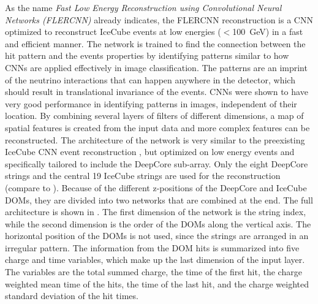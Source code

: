 As the name \textit{Fast Low Energy Reconstruction using Convolutional Neural Networks (FLERCNN)} already indicates, the FLERCNN reconstruction  is a CNN optimized to reconstruct IceCube events at low energies ($<$\SI{100}{\giga\electronvolt}) in a fast and efficient manner. The network is trained to find the connection between the hit pattern and the events properties by identifying patterns similar to how CNNs are applied effectively in image classification. The patterns are an imprint of the neutrino interactions that can happen anywhere in the detector, which should result in translational invariance of the events. CNNs were shown to have very good performance in identifying patterns in images, independent of their location. By combining several layers of filters of different dimensions, a map of spatial features is created from the input data and more complex features can be reconstructed. The architecture of the network is very similar to the preexisting IceCube CNN event reconstruction , but optimized on low energy events and specifically tailored to include the DeepCore sub-array. Only the eight DeepCore strings and the central 19 IceCube strings are used for the reconstruction (compare to ). Because of the different z-positions of the DeepCore and IceCube DOMs, they are divided into two networks that are combined at the end. The full architecture is shown in . The first dimension of the network is the string index, while the second dimension is the order of the DOMs along the vertical axis. The horizontal position of the DOMs is not used, since the strings are arranged in an irregular pattern. The information from the DOM hits is summarized into five charge and time variables, which make up the last dimension of the input layer. The variables are the total summed charge, the time of the first hit, the charge weighted mean time of the hits, the time of the last hit, and the charge weighted standard deviation of the hit times.


